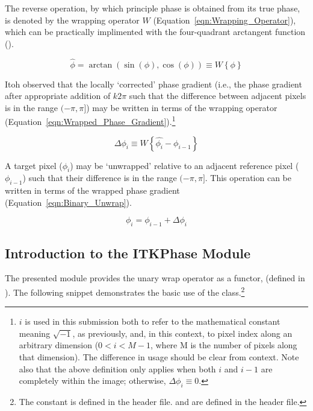 The reverse operation, by which principle phase is obtained from its true phase, is denoted by the wrapping operator $W{}$ (Equation~\ref{eqn:Wrapping_Operator}), which can be practically implimented with the four-quadrant arctangent function ().

\begin{equation}
\label{eqn:Wrapping_Operator}
\hat{\phi} = \arctan( \sin( \phi ), \cos( \phi )) \equiv W \left\{ \phi \right\}
\end{equation}

Itoh \cite{Itoh1982} observed that the locally `corrected' phase gradient (i.e., the phase gradient after appropriate addition of $k2\pi$ such that the difference between adjacent pixels is in the range $(-\pi,\pi]$) may be written in terms of the wrapping operator (Equation~\ref{eqn:Wrapped_Phase_Gradient}).\footnote{$i$ is used in this submission both to refer to the mathematical constant meaning $\sqrt{-1}$, as previously, and, in this context, to pixel index along an arbitrary dimension ($0 < i < M-1$, where M is the number of pixels along that dimension).  The difference in usage should be clear from context.  Note also that the above definition only applies when both $i$ and $i-1$ are completely within the image; otherwise, $\Delta \phi_i \equiv 0$.}

\begin{equation}
\label{eqn:Wrapped_Phase_Gradient}
\Delta \phi_{i} \equiv W \left \{ \hat{\phi_{i}} - \phi_{i-1} \right \}
\end{equation}

A target pixel ($\phi_{i}$) may be `unwrapped' relative to an adjacent reference pixel ($\phi_{i-1}$) such that their difference is in the range $(-\pi, \pi]$.  This operation can be written in terms of the wrapped phase gradient (Equation~\ref{eqn:Binary_Unwrap}).

\begin{equation}
\label{eqn:Binary_Unwrap}
\phi_{i} = \phi_{i-1} + \Delta \phi_{i}
\end{equation}

\subsection{Introduction to the ITKPhase Module}

The presented module provides the unary wrap operator as a functor,  (defined in ).  The following snippet demonstrates the basic use of the class.\footnote{The constant  is defined in the  header file.  and  are defined in the  header file.}

